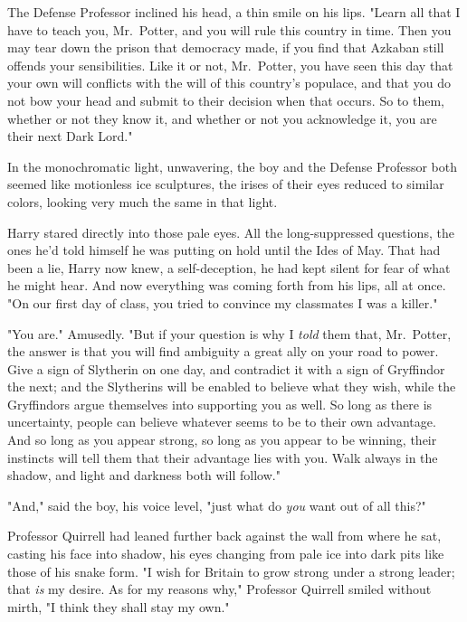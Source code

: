 The Defense Professor inclined his head, a thin smile on his lips. "Learn all 
that I have to teach you, Mr.~Potter, and you will rule this country in time. 
Then you may tear down the prison that democracy made, if you find that Azkaban 
still offends your sensibilities. Like it or not, Mr.~Potter, you have seen 
this day that your own will conflicts with the will of this country's populace, 
and that you do not bow your head and submit to their decision when that 
occurs. So to them, whether or not they know it, and whether or not you 
acknowledge it, you are their next Dark Lord."

In the monochromatic light, unwavering, the boy and the Defense Professor both 
seemed like motionless ice sculptures, the irises of their eyes reduced to 
similar colors, looking very much the same in that light.

Harry stared directly into those pale eyes. All the long-suppressed questions, 
the ones he'd told himself he was putting on hold until the Ides of May. That 
had been a lie, Harry now knew, a self-deception, he had kept silent for fear 
of what he might hear. And now everything was coming forth from his lips, all 
at once. "On our first day of class, you tried to convince my classmates I was 
a killer."

"You are." Amusedly. "But if your question is why I \emph{told} them that, 
Mr.~Potter, the answer is that you will find ambiguity a great ally on your 
road to power. Give a sign of Slytherin on one day, and contradict it with a 
sign of Gryffindor the next; and the Slytherins will be enabled to believe what 
they wish, while the Gryffindors argue themselves into supporting you as well. 
So long as there is uncertainty, people can believe whatever seems to be to 
their own advantage. And so long as you appear strong, so long as you appear to 
be winning, their instincts will tell them that their advantage lies with you. 
Walk always in the shadow, and light and darkness both will follow."

"And," said the boy, his voice level, "just what do \emph{you} want out of all 
this?"

Professor Quirrell had leaned further back against the wall from where he sat, 
casting his face into shadow, his eyes changing from pale ice into dark pits 
like those of his snake form. "I wish for Britain to grow strong under a strong 
leader; that \emph{is} my desire. As for my reasons why," Professor Quirrell 
smiled without mirth, "I think they shall stay my own."

